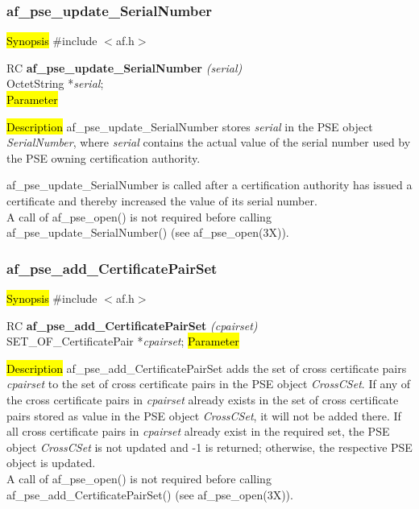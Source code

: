 \subsubsection{af\_pse\_update\_SerialNumber}
\label{af_update_SerialNumber}
\hl{Synopsis}
\#include $<$af.h$>$

RC {\bf af\_pse\_update\_SerialNumber} {\em (serial)} \\
OctetString *{\em serial}; \\
\hl{Parameter}

\hl{Description}
af\_pse\_update\_SerialNumber stores {\em serial} in the PSE object {\em SerialNumber},
where {\em serial} contains the actual value of the serial number used by the PSE owning certification
authority. 

af\_pse\_update\_SerialNumber is called after a certification authority has issued a
certificate and thereby increased the value of its serial number.
\\ [1em]
A call of af\_pse\_open() is not required before calling af\_pse\_update\_SerialNumber()
(see af\_pse\_open(3X)).


\subsubsection{af\_pse\_add\_CertificatePairSet}
\label{af_add_CertificatePairSet}
\hl{Synopsis}
\#include $<$af.h$>$

RC {\bf af\_pse\_add\_CertificatePairSet} {\em (cpairset)} \\
SET\_OF\_CertificatePair *{\em cpairset};
\hl{Parameter}

\hl{Description}
af\_pse\_add\_CertificatePairSet adds the set of cross certificate pairs {\em cpairset}
to the set of cross certificate pairs in the PSE object {\em CrossCSet}. 
If any of the cross certificate pairs in {\em cpairset} already exists in the set of cross
certificate pairs stored as value in the PSE object {\em CrossCSet}, it will not be added there.
If all cross certificate pairs in {\em cpairset} already exist in the required set,
the PSE object {\em CrossCSet} is not updated and -1 is returned; otherwise, the respective 
PSE object is updated. 
\\ [1em]
A call of af\_pse\_open() is not required before calling af\_pse\_add\_CertificatePairSet()
(see af\_pse\_open(3X)).

